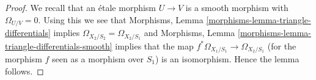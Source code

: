 \documentclass[10pt,a4paper]{amsart}
\theoremstyle{plain}
\theoremstyle{definition}
\theoremstyle{remark}
\numberwithin{equation}{subsection}
\begin{document}
\begin{proof}
We recall that an \'etale morphism $U \to V$ is a smooth morphism
with $\Omega_{U/V} = 0$. Using this we see that
Morphisms, Lemma \ref{morphisms-lemma-triangle-differentials}
implies $\Omega_{X_2/S_2} = \Omega_{X_2/S_1}$ and
Morphisms, Lemma \ref{morphisms-lemma-triangle-differentials-smooth}
implies that the map $f^*\Omega_{X_1/S_1} \to \Omega_{X_2/S_1}$
(for the morphism $f$ seen as a morphism over $S_1$)
is an isomorphism. Hence the lemma follows.
\end{proof}
\end{document}

